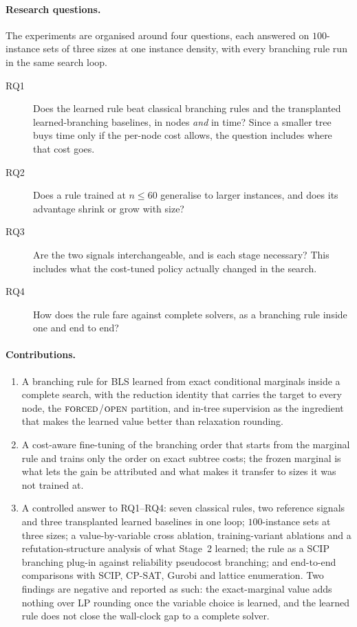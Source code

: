 \documentclass[final,5p,times,twocolumn,authoryear]{elsarticle}
\newcommand{\FORCED}{\textsc{forced}}
\newcommand{\FREE}{\textsc{open}}
\begin{document}
\paragraph{Research questions.} The experiments are organised around four questions, each answered on $100$-instance sets of three sizes at one instance density, with every branching rule run in the same search loop.
\begin{description}
\item[RQ1] Does the learned rule beat classical branching rules and the transplanted learned-branching baselines, in nodes \emph{and} in time? Since a smaller tree buys time only if the per-node cost allows, the question includes where that cost goes.
\item[RQ2] Does a rule trained at $n\le60$ generalise to larger instances, and does its advantage shrink or grow with size?
\item[RQ3] Are the two signals interchangeable, and is each stage necessary? This includes what the cost-tuned policy actually changed in the search.
\item[RQ4] How does the rule fare against complete solvers, as a branching rule inside one and end to end?
\end{description}

\paragraph{Contributions.}
\begin{enumerate}
\item A branching rule for BLS learned from exact conditional marginals inside a complete search, with the reduction identity that carries the target to every node, the $\FORCED$/$\FREE$ partition, and in-tree supervision as the ingredient that makes the learned value better than relaxation rounding.
\item A cost-aware fine-tuning of the branching order that starts from the marginal rule and trains only the order on exact subtree costs; the frozen marginal is what lets the gain be attributed and what makes it transfer to sizes it was not trained at.
\item A controlled answer to RQ1--RQ4: seven classical rules, two reference signals and three transplanted learned baselines in one loop; $100$-instance sets at three sizes; a value-by-variable cross ablation, training-variant ablations and a refutation-structure analysis of what Stage~2 learned; the rule as a SCIP branching plug-in against reliability pseudocost branching; and end-to-end comparisons with SCIP, CP-SAT, Gurobi and lattice enumeration. Two findings are negative and reported as such: the exact-marginal value adds nothing over LP rounding once the variable choice is learned, and the learned rule does not close the wall-clock gap to a complete solver.
\end{enumerate}
\end{document}
